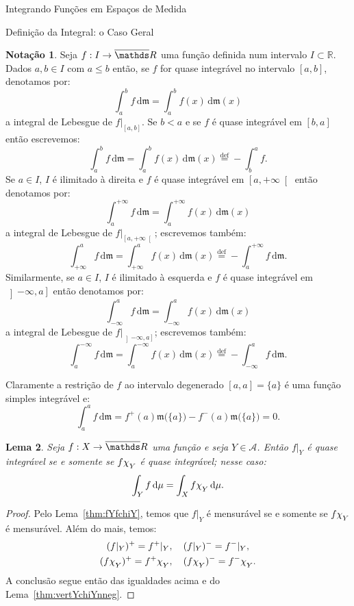 \documentclass[oneside,final,11pt]{amsbook}
\newcommand{\R}{\mathds R}
\newcommand{\leb}{\mathfrak m}
\newcommand{\dd}{\mathrm d}
\newcommand{\chilow}[1]{\chi_{\lower2pt\hbox{$\scriptstyle#1$}}}
\theoremstyle{remark}\newtheorem{exercise}{Exercício}[chapter]
\theoremstyle{remark}\newtheorem{*exercise}[exercise]{\hbox to 0pt{\hskip 0pt minus 1fil*}Exercício}
\theoremstyle{definition}\newtheorem{exdefin}{Definição}[chapter]
\theoremstyle{plain}\newtheorem{teo}{Teorema}[section]
\theoremstyle{plain}\newtheorem{lem}[teo]{Lema}
\theoremstyle{plain}\newtheorem{prop}[teo]{Proposição}
\theoremstyle{plain}\newtheorem{cor}[teo]{Corolário}
\theoremstyle{definition}\newtheorem{defin}[teo]{Definição}
\theoremstyle{remark}\newtheorem{rem}[teo]{Observação}
\theoremstyle{definition}\newtheorem{notation}[teo]{Notação}
\theoremstyle{definition}\newtheorem{convention}[teo]{Convenção}
\theoremstyle{definition}\newtheorem{example}[teo]{Exemplo}
\numberwithin{section}{chapter}
\numberwithin{equation}{section}
\begin{document}
\begin{chapter}{Integrando Funções em Espaços de Medida}
\begin{section}{Definição da Integral: o Caso Geral}
\begin{notation}
Seja $f:I\to\overline\R$ uma função definida num intervalo $I\subset\R$. Dados
$a,b\in I$ com $a\le b$ então, se $f$ for quase integrável no intervalo $[a,b]$, denotamos
por:\index[simbolos]{$\int_a^bf\,\dd\leb$}\index[simbolos]{$\int_a^bf(x)\,\dd\leb(x)$}
\[\int_a^bf\,\dd\leb=\int_a^bf(x)\,\dd\leb(x)\]
a integral de Lebesgue de $f\vert_{[a,b]}$. Se $b<a$ e se $f$ é quase integrável
em $[b,a]$ então escrevemos:
\[\int_a^bf\,\dd\leb=\int_a^bf(x)\,\dd\leb(x)\stackrel{\text{def}}=-\int_b^af.\]
Se $a\in I$, $I$ é ilimitado à direita e $f$ é quase integrável em $\left[a,+\infty\right[$
então denotamos por:\index[simbolos]{$\int_a^{+\infty}f\,\dd\leb$}\index[simbolos]{$\int_a^{+\infty}f(x)\,\dd\leb(x)$}
\[\int_a^{+\infty}f\,\dd\leb=\int_a^{+\infty}f(x)\,\dd\leb(x)\]
a integral de Lebesgue de $f\vert_{\left[a,+\infty\right[}$; escrevemos também:
\[\int_{+\infty}^af\,\dd\leb=\int_{+\infty}^af(x)\,\dd\leb(x)\stackrel{\text{def}}=
-\int_a^{+\infty}f\,\dd\leb.\]
Similarmente, se $a\in I$, $I$ é ilimitado à esquerda e $f$ é quase integrável em $\left]-\infty,a\right]$
então denotamos por:
\[\int_{-\infty}^af\,\dd\leb=\int_{-\infty}^af(x)\,\dd\leb(x)\]
a integral de Lebesgue de $f\vert_{\left]-\infty,a\right]}$; escrevemos também:
\[\int_a^{-\infty}f\,\dd\leb=\int_a^{-\infty}f(x)\,\dd\leb(x)\stackrel{\text{def}}=
-\int_{-\infty}^af\,\dd\leb.\]
\end{notation}
Claramente a restrição de $f$ ao intervalo degenerado $[a,a]=\{a\}$ é uma função
simples integrável e:
\[\int_a^af\,\dd\leb=f^+(a)\leb\big(\{a\}\big)-f^-(a)\leb\big(\{a\}\big)=0.\]

\begin{lem}\label{thm:fYfchiYgeral}
Seja $f:X\to\overline\R$ uma função e seja $Y\in\mathcal A$. Então
$f\vert_Y$ é quase integrável se e somente se $f\chilow Y$ é quase integrável; nesse caso:
\[\int_Yf\,\dd\mu=\int_Xf\chilow Y\,\dd\mu.\]
\end{lem}
\begin{proof}
Pelo Lema~\ref{thm:fYfchiY}, temos que $f\vert_Y$ é mensurável se e somente se
$f\chilow Y$ é mensurável. Além do mais, temos:
\begin{gather*}
(f\vert_Y)^+=f^+\vert_Y,\quad(f\vert_Y)^-=f^-\vert_Y,\\
(f\chilow Y)^+=f^+\chilow Y,\quad(f\chilow Y)^-=f^-\chilow Y.
\end{gather*}
A conclusão segue então das igualdades acima e do Lema~\ref{thm:vertYchiYnneg}.
\end{proof}


\end{section}
\end{chapter}
\end{document}
